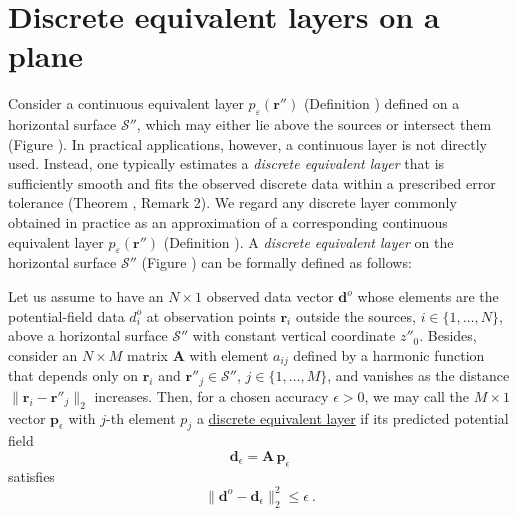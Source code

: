 \section{Discrete equivalent layers on a plane}
\label{eq:planar_eqlayer}

Consider a continuous equivalent layer $p_{\varepsilon}(\mathbf{r}'')$ (Definition )  
defined on a horizontal surface $\mathcal{S}''$, which may either lie above the sources or intersect them  
(Figure ). In practical applications, however, a continuous layer is not directly used.  
Instead, one typically estimates a \textit{discrete equivalent layer} that is sufficiently smooth and fits the observed  
discrete data within a prescribed error tolerance (Theorem , Remark 2). 
We regard any discrete layer commonly obtained in practice  
as an approximation of a corresponding continuous equivalent layer $p_{\varepsilon}(\mathbf{r}'')$  
(Definition ). A \textit{discrete equivalent layer} on the horizontal surface  
$\mathcal{S}''$ (Figure ) can be formally defined as follows:  

\begin{definition}
	Let us assume to have an $N \times 1$ observed data vector $\mathbf{d}^{o}$ whose elements 
	are the potential-field data $d^{o}_{i}$ at observation points $\mathbf{r}_{i}$ outside the sources, 
	$i \in \{1, \dots, N\}$, above a horizontal surface $\mathcal{S}''$ with constant vertical 
	coordinate $z''_{0}$. Besides, consider an $N \times M$ 
	matrix $\mathbf{A}$ with element $a_{ij}$ defined by a harmonic function that depends only on $\mathbf{r}_{i}$ 
	and $\mathbf{r}''_{j} \in \mathcal{S}''$, $j \in \{1, \dots, M\}$, and
	vanishes as the distance $\| \mathbf{r}_{i} - \mathbf{r}''_{j} \|_{2}$ increases. 
	Then, for a chosen accuracy $\epsilon > 0$, we may call the $M \times 1$ vector $\mathbf{p}_{\epsilon}$ with $j$-th element $p_{j}$ 
	a \underline{discrete equivalent layer} if its predicted potential field 
	\begin{equation}
		\mathbf{d}_{\epsilon} = \mathbf{A} \, \mathbf{p}_{\epsilon}
		\label{eq:predicted-data-discrete-layer}
	\end{equation}
	satisfies 
	\begin{equation}
		\| \mathbf{d}^{o} - \mathbf{d}_{\epsilon} \|_{2}^{2} \le \epsilon \: .
		\label{eq:epsilon-bound-data-discrete}
	\end{equation}
	\label{def:discrete-eqlayer}
\end{definition}

